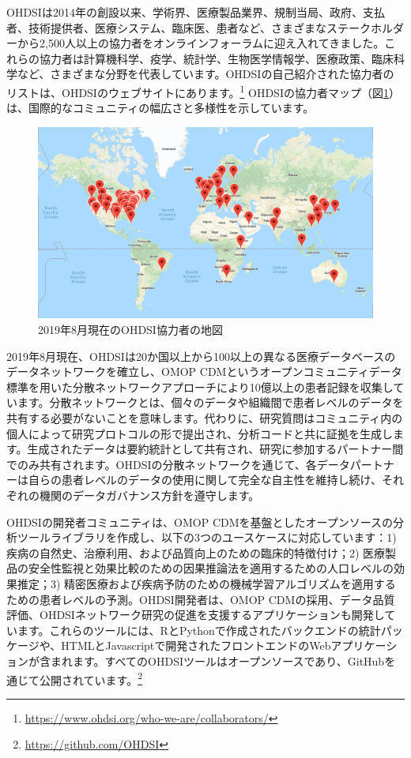 \documentclass[
  11pt]{book}
\theoremstyle{definition}
\theoremstyle{definition}
\theoremstyle{definition}
\theoremstyle{definition}
\theoremstyle{remark}
\begin{document}
OHDSIは2014年の創設以来、学術界、医療製品業界、規制当局、政府、支払者、技術提供者、医療システム、臨床医、患者など、さまざまなステークホルダーから2,500人以上の協力者をオンラインフォーラムに迎え入れてきました。これらの協力者は計算機科学、疫学、統計学、生物医学情報学、医療政策、臨床科学など、さまざまな分野を代表しています。OHDSIの自己紹介された協力者のリストは、OHDSIのウェブサイトにあります。\footnote{\url{https://www.ohdsi.org/who-we-are/collaborators/}} OHDSIの協力者マップ（図\ref{fig:collaboratormap}）は、国際的なコミュニティの幅広さと多様性を示しています。

\begin{figure}

{\centering \includegraphics[width=1\linewidth]{images/OhdsiCommunity/mapOfCollaborators} 

}

\caption{2019年8月現在のOHDSI協力者の地図}\label{fig:collaboratormap}
\end{figure}

2019年8月現在、OHDSIは20か国以上から100以上の異なる医療データベースのデータネットワークを確立し、OMOP CDMというオープンコミュニティデータ標準を用いた分散ネットワークアプローチにより10億以上の患者記録を収集しています。分散ネットワークとは、個々のデータや組織間で患者レベルのデータを共有する必要がないことを意味します。代わりに、研究質問はコミュニティ内の個人によって研究プロトコルの形で提出され、分析コードと共に証拠を生成します。生成されたデータは要約統計として共有され、研究に参加するパートナー間でのみ共有されます。OHDSIの分散ネットワークを通じて、各データパートナーは自らの患者レベルのデータの使用に関して完全な自主性を維持し続け、それぞれの機関のデータガバナンス方針を遵守します。

OHDSIの開発者コミュニティは、OMOP CDMを基盤としたオープンソースの分析ツールライブラリを作成し、以下の3つのユースケースに対応しています：1) 疾病の自然史、治療利用、および品質向上のための臨床的特徴付け；2) 医療製品の安全性監視と効果比較のための因果推論法を適用するための人口レベルの効果推定；3) 精密医療および疾病予防のための機械学習アルゴリズムを適用するための患者レベルの予測。OHDSI開発者は、OMOP CDMの採用、データ品質評価、OHDSIネットワーク研究の促進を支援するアプリケーションも開発しています。これらのツールには、RとPythonで作成されたバックエンドの統計パッケージや、HTMLとJavascriptで開発されたフロントエンドのWebアプリケーションが含まれます。すべてのOHDSIツールはオープンソースであり、GitHubを通じて公開されています。\footnote{\url{https://github.com/OHDSI}}
\end{document}
